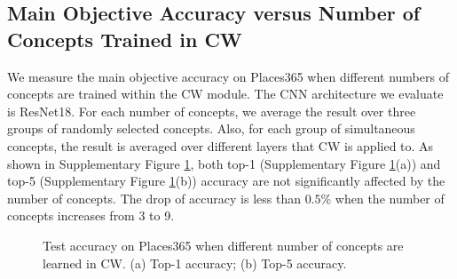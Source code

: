 \documentclass{article}
\begin{document}
\begin{table*}[t]
\begin{floatrow}

\end{floatrow}

\end{table*}

\subsection{Main Objective Accuracy versus Number of Concepts Trained in CW}
\label{sec:acc_ncpt}
We measure the main objective accuracy on Places365 when different numbers of concepts are trained within the CW module. The CNN architecture we evaluate is ResNet18. For each number of concepts, we average the result over three groups of randomly selected concepts. Also, for each group of simultaneous concepts, the result is averaged over different layers that CW is applied to. As shown in Supplementary Figure  \ref{fig:acc_ncpt}, both top-1 (Supplementary Figure  \ref{fig:acc_ncpt}(a)) and top-5 (Supplementary Figure  \ref{fig:acc_ncpt}(b)) accuracy are not significantly affected by the number of concepts. The drop of accuracy is less than $0.5\%$ when the number of concepts increases from 3 to 9.

\begin{figure}[ht]
  \caption{Test accuracy on Places365 when different number of concepts are learned in CW. (a) Top-1 accuracy; (b) Top-5 accuracy.}
  \label{fig:acc_ncpt}
\end{figure}
\end{document}
